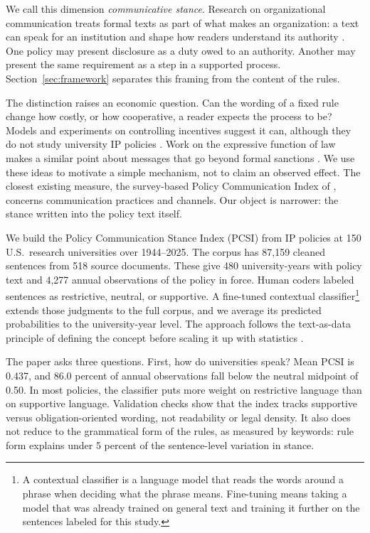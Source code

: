 \documentclass[11pt]{article}
\begin{document}
We call this dimension \emph{communicative stance}. Research on organizational communication treats formal texts as part of what makes an organization: a text can speak for an institution and shape how readers understand its authority \citep{smith2001texts,cooren2004textual,fairhurst2004organizations,putnam2004alternative}. One policy may present disclosure as a duty owed to an authority. Another may present the same requirement as a step in a supported process. Section~\ref{sec:framework} separates this framing from the content of the rules.

The distinction raises an economic question. Can the wording of a fixed rule change how costly, or how cooperative, a reader expects the process to be? Models and experiments on controlling incentives suggest it can, although they do not study university IP policies \citep{benabou2003intrinsic,falk2006hidden}. Work on the expressive function of law makes a similar point about messages that go beyond formal sanctions \citep{sunstein1996expressive}. We use these ideas to motivate a simple mechanism, not to claim an observed effect. The closest existing measure, the survey-based Policy Communication Index of \citet{canary2013policy}, concerns communication practices and channels. Our object is narrower: the stance written into the policy text itself.

We build the Policy Communication Stance Index (PCSI) from IP policies at 150 U.S.\ research universities over 1944--2025. The corpus has 87,159 cleaned sentences from 518 source documents. These give 480 university-years with policy text and 4,277 annual observations of the policy in force. Human coders labeled sentences as restrictive, neutral, or supportive. A fine-tuned contextual classifier\footnote{A contextual classifier is a language model that reads the words around a phrase when deciding what the phrase means. Fine-tuning means taking a model that was already trained on general text and training it further on the sentences labeled for this study.} extends those judgments to the full corpus, and we average its predicted probabilities to the university-year level. The approach follows the text-as-data principle of defining the concept before scaling it up with statistics \citep{grimmer2013text,gentzkow2019text,adcock2001measurement}.

The paper asks three questions. First, how do universities speak? Mean PCSI is 0.437, and 86.0 percent of annual observations fall below the neutral midpoint of 0.50. In most policies, the classifier puts more weight on restrictive language than on supportive language. Validation checks show that the index tracks supportive versus obligation-oriented wording, not readability or legal density. It also does not reduce to the grammatical form of the rules, as measured by keywords: rule form explains under 5 percent of the sentence-level variation in stance.
\end{document}
